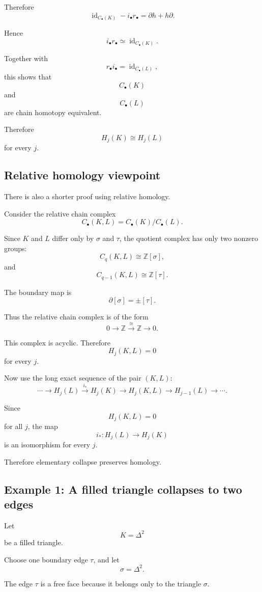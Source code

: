 \documentclass[12pt,a4paper]{article}
\theoremstyle{notespace}
\begin{document}
Therefore
\[
\operatorname{id}_{C_\bullet(K)}-i_\bullet r_\bullet
=
\partial h+h\partial.
\]

Hence
\[
i_\bullet r_\bullet\simeq \operatorname{id}_{C_\bullet(K)}.
\]

Together with
\[
r_\bullet i_\bullet=\operatorname{id}_{C_\bullet(L)},
\]
this shows that
\[
C_\bullet(K)
\]
and
\[
C_\bullet(L)
\]
are chain homotopy equivalent.

Therefore
\[
H_j(K)\cong H_j(L)
\]
for every \(j\).

\subsection{Relative homology viewpoint}

There is also a shorter proof using relative homology.

Consider the relative chain complex
\[
C_\bullet(K,L)=C_\bullet(K)/C_\bullet(L).
\]

Since \(K\) and \(L\) differ only by \(\sigma\) and \(\tau\), the quotient complex has only two nonzero groups:
\[
C_q(K,L)\cong \mathbb Z[\sigma],
\]
and
\[
C_{q-1}(K,L)\cong \mathbb Z[\tau].
\]

The boundary map is
\[
\partial[\sigma]=\pm[\tau].
\]

Thus the relative chain complex is of the form
\[
0\longrightarrow \mathbb Z
\xrightarrow{\cong}
\mathbb Z
\longrightarrow 0.
\]

This complex is acyclic. Therefore
\[
H_j(K,L)=0
\]
for every \(j\).

Now use the long exact sequence of the pair \((K,L)\):
\[
\cdots
\longrightarrow H_j(L)
\xrightarrow{i_*}
H_j(K)
\longrightarrow H_j(K,L)
\longrightarrow H_{j-1}(L)
\longrightarrow \cdots .
\]

Since
\[
H_j(K,L)=0
\]
for all \(j\), the map
\[
i_*\colon H_j(L)\to H_j(K)
\]
is an isomorphism for every \(j\).

Therefore elementary collapse preserves homology.

\subsection{Example 1: A filled triangle collapses to two edges}

Let
\[
K=\Delta^2
\]
be a filled triangle.

Choose one boundary edge \(\tau\), and let
\[
\sigma=\Delta^2.
\]

The edge \(\tau\) is a free face because it belongs only to the triangle \(\sigma\).
\end{document}
